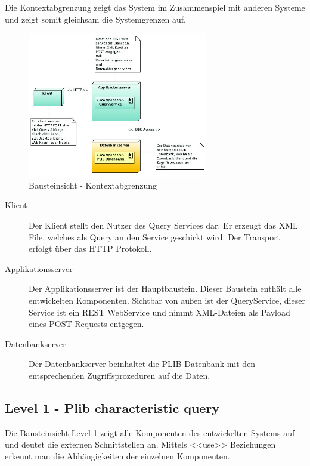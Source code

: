 Die Kontextabgrenzung zeigt das System im Zusammenspiel mit anderen Systeme und zeigt somit gleichsam die Systemgrenzen auf. 

\begin{figure}[!htbp]
	\centering
		\includegraphics[width=0.7\textwidth]{images/bausteinsicht_plib_level0.jpg}
	\caption{Bausteinsicht - Kontextabgrenzung}
	\label{fig:bausteinsicht_level0}
\end{figure}

\begin{description}
\item[Klient] Der Klient stellt den Nutzer des Query Services dar. Er erzeugt das XML File, welches als Query an den Service geschickt wird. Der Transport erfolgt über das HTTP Protokoll. 
\item[Applikationsserver] Der Applikationsserver ist der Hauptbaustein. Dieser Baustein enthält alle entwickelten Komponenten. Sichtbar von außen ist der QueryService, dieser Service ist ein REST WebService und nimmt XML-Dateien als Payload eines POST Requests entgegen. 
\item[Datenbankserver] Der Datenbankserver beinhaltet die PLIB Datenbank mit den entsprechenden Zugriffsprozeduren auf die Daten. 
\end{description}

\subsection{Level 1 - Plib characteristic query} 

Die Bausteinsicht Level 1 zeigt alle Komponenten des entwickelten Systems auf und deutet die externen Schnittstellen an. Mittels <<use>> Beziehungen erkennt man die Abhängigkeiten der einzelnen Komponenten. 

